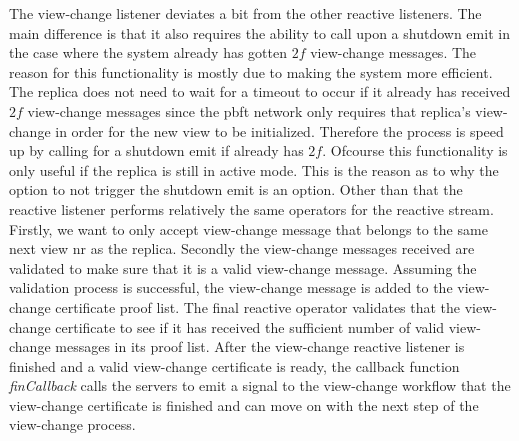The view-change listener deviates a bit from the other reactive listeners. The main difference is that it also requires the ability to call upon a shutdown emit in the case where the system already has gotten $2f$ view-change messages. The reason for this functionality is mostly due to making the system more efficient. The replica does not need to wait for a timeout to occur if it already has received $2f$ view-change messages since the \ac{pbft} network only requires that replica's view-change in order for the new view to be initialized. Therefore the process is speed up by calling for a shutdown emit if already has $2f$. Ofcourse this functionality is only useful if the replica is still in active mode. This is the reason as to why the option to not trigger the shutdown emit is an option. Other than that the reactive listener performs relatively the same operators for the reactive stream. Firstly, we want to only accept view-change message that belongs to the same next view nr as the replica. Secondly the view-change messages received are validated to make sure that it is a valid view-change message. Assuming the validation process is successful, the view-change message is added to the view-change certificate proof list. The final reactive operator validates that the view-change certificate to see if it has received the sufficient number of valid view-change messages in its proof list. After the view-change reactive listener is finished and a valid view-change certificate is ready, the callback function \emph{finCallback} calls the servers to emit a signal to the view-change workflow that the view-change certificate is finished and can move on with the next step of the view-change process. 

